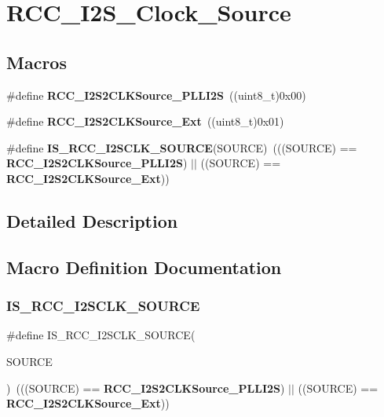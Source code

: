 \section{R\+C\+C\+\_\+\+I2\+S\+\_\+\+Clock\+\_\+\+Source}
\label{group__RCC__I2S__Clock__Source}
\subsection*{Macros}
\begin{DoxyCompactItemize}
\item 
\#define \textbf{ R\+C\+C\+\_\+\+I2\+S2\+C\+L\+K\+Source\+\_\+\+P\+L\+L\+I2S}~((uint8\+\_\+t)0x00)
\item 
\#define \textbf{ R\+C\+C\+\_\+\+I2\+S2\+C\+L\+K\+Source\+\_\+\+Ext}~((uint8\+\_\+t)0x01)
\item 
\#define \textbf{ I\+S\+\_\+\+R\+C\+C\+\_\+\+I2\+S\+C\+L\+K\+\_\+\+S\+O\+U\+R\+CE}(S\+O\+U\+R\+CE)~(((S\+O\+U\+R\+CE) == \textbf{ R\+C\+C\+\_\+\+I2\+S2\+C\+L\+K\+Source\+\_\+\+P\+L\+L\+I2S}) $\vert$$\vert$ ((S\+O\+U\+R\+CE) == \textbf{ R\+C\+C\+\_\+\+I2\+S2\+C\+L\+K\+Source\+\_\+\+Ext}))
\end{DoxyCompactItemize}


\subsection{Detailed Description}


\subsection{Macro Definition Documentation}
\mbox{\label{group__RCC__I2S__Clock__Source_gaa1bd931fa367969adeec7ba154ef7beb}} 
\subsubsection{I\+S\+\_\+\+R\+C\+C\+\_\+\+I2\+S\+C\+L\+K\+\_\+\+S\+O\+U\+R\+CE}
{\footnotesize\ttfamily \#define I\+S\+\_\+\+R\+C\+C\+\_\+\+I2\+S\+C\+L\+K\+\_\+\+S\+O\+U\+R\+CE(\begin{DoxyParamCaption}\item[{}]{S\+O\+U\+R\+CE }\end{DoxyParamCaption})~(((S\+O\+U\+R\+CE) == \textbf{ R\+C\+C\+\_\+\+I2\+S2\+C\+L\+K\+Source\+\_\+\+P\+L\+L\+I2S}) $\vert$$\vert$ ((S\+O\+U\+R\+CE) == \textbf{ R\+C\+C\+\_\+\+I2\+S2\+C\+L\+K\+Source\+\_\+\+Ext}))}



